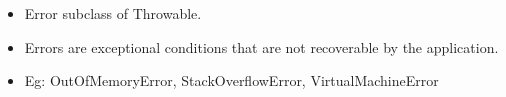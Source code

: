 \setlength{\columnsep}{3pt}
\begin{flushleft}

	\begin{itemize}
		\item Error subclass of Throwable.
		\item Errors are exceptional conditions that are not recoverable by the application.
		\item Eg: OutOfMemoryError, StackOverflowError, VirtualMachineError
	\end{itemize}	

\end{flushleft}
